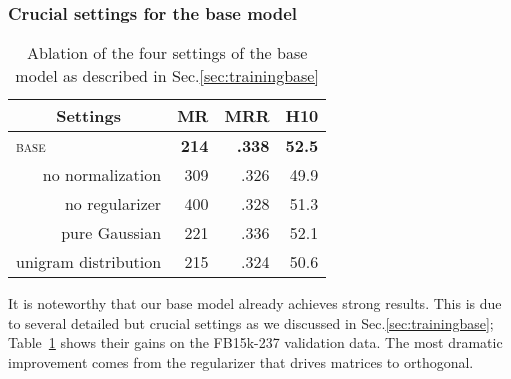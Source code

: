 \documentclass[11pt,a4paper]{article}
\begin{document}
\subsubsection*{Crucial settings for the base model}\label{sec:crucialsettings}

\begin{table}[!t]
\centering
\small
\setlength{\tabcolsep}{8pt}
\begin{tabular}{rrrr}
\toprule
\multicolumn{1}{c}{Settings} & MR & MRR & H10 \\
\midrule
\multicolumn{1}{l}{\textsc{base}} & \textbf{214} & \textbf{.338} & \textbf{52.5} \\ %
\midrule
no normalization & 309 & .326 & 49.9 \\ %
no regularizer & 400 & .328 & 51.3 \\ %
pure Gaussian & 221 & .336 & 52.1 \\ %
\qquad unigram distribution& 215 & .324 & 50.6 \\ %
\bottomrule
\end{tabular}
\caption{Ablation of the four settings of the base model as described 
in Sec.\ref{sec:trainingbase}}
\label{tab:crucial-settings}
\end{table}

It is noteworthy that our base model already achieves strong results. 
This is due to several detailed but crucial settings 
as we discussed in Sec.\ref{sec:trainingbase}; 
Table~\ref{tab:crucial-settings}
shows their gains on 
the FB15k-237 validation data. 
The most dramatic improvement comes from the regularizer that drives matrices 
to orthogonal. 
\end{document}
